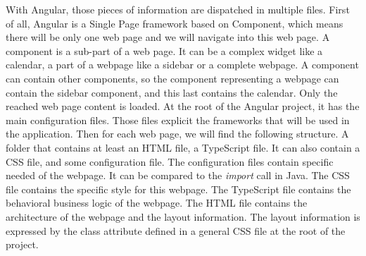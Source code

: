 \documentclass[conference]{IEEEtran}
\begin{document}
\begin{table}[hbtp]
\caption{Comparison of GWT architecture and Angular one}
\label{tab:gwtArchitectureToAngular}
\begin {center}
\end{center}
\end{table}


With Angular, those pieces of information are dispatched in multiple files.
First of all, Angular is a Single Page framework based on Component,
    which means there will be only one web page 
    and we will navigate into this web page.
A component is a sub-part of a web page.
It can be a complex widget like a calendar,
    a part of a webpage like a sidebar
    or a complete webpage.
A component can contain other components, 
    so the component representing a webpage can contain the sidebar component,
    and this last contains the calendar.
Only the reached web page content is loaded.
At the root of the Angular project,
    it has the main configuration files.
Those files explicit the frameworks that will be used in the application.
Then for each web page, we will find the following structure.
A folder that contains at least an HTML file, a TypeScript file.
It can also contain a CSS file, and some configuration file.
The configuration files contain specific needed of the webpage.
It can be compared to the \textit{import} call in Java.
The CSS file contains the specific style for this webpage.
The TypeScript file contains the behavioral business logic of the webpage. 
The HTML file contains the architecture of the webpage and the layout information.
The layout information is expressed by the class attribute defined in a general CSS file 
    at the root of the project. 

\end{document}
